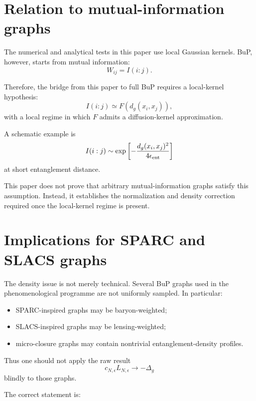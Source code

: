 \documentclass[11pt,a4paper]{article}
\begin{document}
\section{Relation to mutual-information graphs}

The numerical and analytical tests in this paper use local Gaussian kernels.
BuP, however, starts from mutual information:
\begin{equation}
W_{ij}=I(i:j).
\end{equation}

Therefore, the bridge from this paper to full BuP requires a local-kernel
hypothesis:
\begin{equation}
I(i:j)\simeq F(d_g(x_i,x_j)),
\end{equation}
with a local regime in which \(F\) admits a diffusion-kernel approximation.

A schematic example is
\begin{equation}
I(i:j)
\sim
\exp\left[-\frac{d_g(x_i,x_j)^2}{4\epsilon_{\rm ent}}\right]
\end{equation}
at short entanglement distance.

This paper does not prove that arbitrary mutual-information graphs satisfy
this assumption. Instead, it establishes the normalization and density
correction required once the local-kernel regime is present.

\section{Implications for SPARC and SLACS graphs}

The density issue is not merely technical. Several BuP graphs used in the
phenomenological programme are not uniformly sampled. In particular:

\begin{itemize}
\item SPARC-inspired graphs may be baryon-weighted;
\item SLACS-inspired graphs may be lensing-weighted;
\item micro-closure graphs may contain nontrivial entanglement-density profiles.
\end{itemize}

Thus one should not apply the raw result
\begin{equation}
c_{N,\epsilon}L_{N,\epsilon}\to-\Delta_g
\end{equation}
blindly to those graphs.

The correct statement is:
\end{document}
